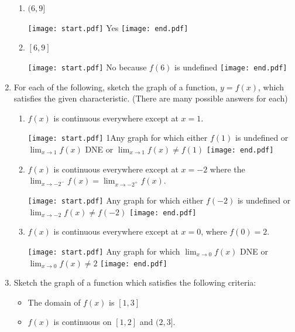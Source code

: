 \documentclass[12pt]{article}
\begin{document}
\begin{enumerate}
\begin{enumerate}
\item $(6,9]$

\texttt{[image: start.pdf]}
{{Yes}}
\texttt{[image: end.pdf]}


\item $[6,9]$

\texttt{[image: start.pdf]}
{{No because $f(6)$ is undefined}}
\texttt{[image: end.pdf]}


\end{enumerate}

\item For each of the following, sketch the graph of a function, $y=f(x)$, which satisfies the given characteristic.  (There are many possible answers for each)

\begin{enumerate}

\item $f(x)$ is continuous everywhere except at $x=1$.

\texttt{[image: start.pdf]}
{{{1\linewidth}{Any graph for which either $f(1)$ is undefined or $\displaystyle \lim_{x \rightarrow 1}{f(x)}$ DNE or $\displaystyle \lim_{x \rightarrow 1}{f(x)} \neq f(1)$}}}
\texttt{[image: end.pdf]}


\item $f(x)$ is continuous everywhere except at $x=-2$ where the $\displaystyle \lim_{x \rightarrow -2^-}{f(x)}=\lim_{x \rightarrow -2^+}{f(x)}$.

\texttt{[image: start.pdf]}
{{Any graph for which either $f(-2)$ is undefined or $\displaystyle \lim_{x \rightarrow -2}{f(x)} \neq f(-2)$}}
\texttt{[image: end.pdf]}


\item $f(x)$ is continuous everywhere except at $x=0$, where $f(0)=2$.

\texttt{[image: start.pdf]}
{{Any graph for which $\displaystyle \lim_{x \rightarrow 0}{f(x)}$ DNE or $\displaystyle \lim_{x \rightarrow 0}{f(x)} \neq 2$}}
\texttt{[image: end.pdf]}


\end{enumerate}

\item Sketch the graph of a function which satisfies the following criteria:

\begin{itemize}

\item The domain of $f(x)$ is $[1,3]$

\item $f(x)$ is continuous on $[1,2]$ and $(2,3]$.


\end{itemize}
\end{enumerate}
\end{document}
